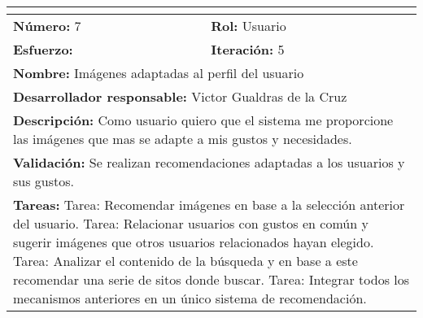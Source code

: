 \begin{tabular}{|p{} |p{} |}
\hline
\multicolumn{2}{|l|}{\cellcolor[HTML]{C0C0C0}{\textbf{Historia de usuario}}} \\ \hline
\textbf{Número:} 7          & \textbf{Rol: } Usuario        \\ \hline
\textbf{Esfuerzo:}           & \textbf{Iteración:} 5         \\ \hline
\multicolumn{2}{|p{0.8\textwidth}|}{\textbf{Nombre:} Imágenes adaptadas al perfil del usuario} \\ \hline
\multicolumn{2}{|p{0.8\textwidth}|}{\textbf{Desarrollador responsable:} Victor Gualdras de la Cruz} \\ \hline
\multicolumn{2}{|p{0.8\textwidth}|}{\textbf{Descripción:}\newline
Como usuario quiero que el sistema me proporcione las imágenes que mas se adapte a mis gustos y necesidades.
} \\ \hline
\multicolumn{2}{|p{0.8\textwidth}|}{\textbf{Validación:}\newline
Se realizan recomendaciones adaptadas a los usuarios y sus gustos.} \\ \hline
\multicolumn{2}{|p{0.8\textwidth}|}{\textbf{Tareas:}\newline
Tarea: Recomendar imágenes en base a la selección anterior del usuario.
Tarea: Relacionar usuarios con gustos en común y sugerir imágenes que otros usuarios relacionados hayan elegido.
Tarea: Analizar el contenido de la búsqueda y en base a este recomendar una serie de sitos donde buscar.
Tarea: Integrar todos los mecanismos anteriores en un único sistema de recomendación.
} \\ \hline
\end{tabular}